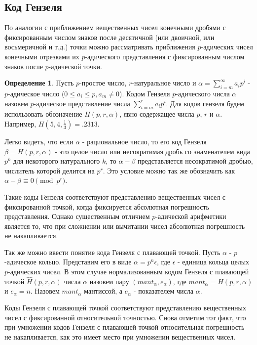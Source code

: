 \documentclass[master, och, diploma, times]{sty/SCWorks}
\theoremstyle{plain}
\theoremstyle{definition}
\newtheorem{defn}{Определение}[section]
\begin{document}
\subsection{Код Гензеля}
По аналогии с приближением вещественных чисел конечными дробями с фиксированным числом знаков после десятичной (или двоичной, или восьмеричной и т.д.) точки можно рассматривать приближения $p$-адических чисел конечными отрезками их $p$-адического представления с фиксированным числом знаков после $p$-адической точки.

\begin{defn}
Пусть $p$-простое число, $r$-натуральное число и $\alpha=\sum\limits^{\infty}_{i=m} a_ip^i$ - $p$-адическое число ($0 \le a_i \le p, a_m \neq 0$). Кодом Гензеля $p$-адического числа $\alpha$ назовем $p$-адическое представление числа $\sum\limits_{i=m}^{r}a_ip^i$. Для кодов гензеля будем использовать обозначение $H(p,r,\alpha)$, явно содержащее числа $p$, $r$ и $\alpha$. Например, $H(5,4,\frac{1}{3})=.2313$.
\end{defn}

Легко видеть, что если $\alpha$ - рациональное число, то его код Гензеля $\beta=H(p,r, \alpha)$ - это целое число или несократимая дробь со знаменателем вида $p^k$ для некоторого натурального $k$, то $\alpha-\beta$ представляется несократимой дробью, числитель которой делится на $p^r$. Это условие можно так же обозначить как $\alpha - \beta \equiv 0 \pmod {p^r}$.

Такие коды Гензеля соответствуют представлению вещественных чисел с фиксированной точкой, когда фиксируется абсолютная погрешность представления. Однако существенным отличием $p$-адической арифметики является то, что при сложнении или вычитании чисел абсолютная погрешность не накапливается.

Так же можно ввести понятие кода Гензеля с плавающей точкой. Пусть $\alpha$ - $p$-адическое кольцо. Представим его в виде $\alpha=p^n\epsilon$, где $\epsilon$ - единица кольца целых $p$-адических чисел. В этом случае нормализованным кодом Гензеля с плавающей точкой $\hat H (p, r, \alpha)$ числа $\alpha$ назовем пару $(mant_{\alpha},e_{\alpha})$, где \mbox{$mant_\alpha = H(p,r,\alpha)$} и $e_\alpha=n$. Назовем $mant_\alpha$ мантиссой, а $e_\alpha$ - показателем числа $\alpha$.

Коды Гензеля с плавающей точкой соответствуют представлению вещественных чисел с фиксированной относительной точностью. Снова отметим тот факт, что при умножении кодов Гензеля с плавающей точкой относительная погрешность не накапливается, как это имеет место при умножении вещественных чисел.
\end{document}
